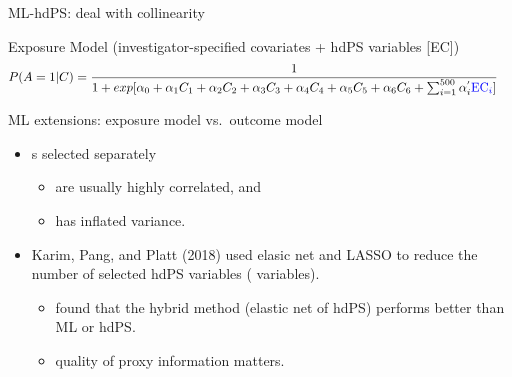 \documentclass[
  ignorenonframetext,
  aspectratio=169]{beamer}
\providecommand{\tightlist}{%
  \setlength{\itemsep}{0pt}\setlength{\parskip}{0pt}}
\begin{document}
\begin{frame}{ML-hdPS: deal with collinearity}
\protect\hypertarget{ml-hdps-deal-with-collinearity-2}{}
\begin{block}{Exposure Model (investigator-specified covariates + hdPS
variables {[}EC{]})}
\protect\hypertarget{exposure-model-investigator-specified-covariates-hdps-variables-ec-1}{}
\begin{equation}
\begin{aligned}
P(A=1|C) &= \frac{1}{1+exp[\alpha_0 + \alpha_1 C_1 + \alpha_2 C_2 + \alpha_3 C_3 + \alpha_4 C_4 + \alpha_5 C_5 + \alpha_6 C_6 +  \sum_{i=1}^{500} \alpha_i^{'} \textcolor{blue}{\text{EC}_i} ]}\nonumber
\end{aligned}
\end{equation}
\end{block}

\begin{block}{ML extensions: exposure model vs.~outcome model}
\protect\hypertarget{ml-extensions-exposure-model-vs.-outcome-model}{}
\begin{itemize}
\tightlist
\item
  \textcolor{blue}{}s selected separately

  \begin{itemize}
  \tightlist
  \item
    are usually highly correlated, and
  \item
    has inflated variance.
  \end{itemize}
\item
  Karim, Pang, and Platt (2018) used elasic net and LASSO to reduce the
  number of selected hdPS variables (\textcolor{blue}{}
  variables).

  \begin{itemize}
  \tightlist
  \item
    found that the hybrid method (elastic net of hdPS) performs better
    than ML or hdPS.
  \item
    quality of proxy information matters.
  \end{itemize}
\end{itemize}
\end{block}
\end{frame}
\end{document}
